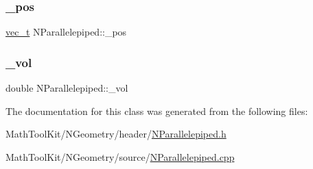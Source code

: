 \mbox{\label{class_n_parallelepiped_ae1cc22beb853095d8a110c641dd8e005}} 
\subsubsection{\texorpdfstring{\_pos}{\_pos}}
{\footnotesize\ttfamily \mbox{\hyperlink{_n_vector_8h_a0a2cfc67e738a3d73e4f12098c4c07f6}{vec\+\_\+t}} N\+Parallelepiped\+::\+\_\+pos\hspace{0.3cm}{\ttfamily [protected]}}

\mbox{\label{class_n_parallelepiped_aabd33c4ffeff864ea342440c08d4702b}} 
\subsubsection{\texorpdfstring{\_vol}{\_vol}}
{\footnotesize\ttfamily double N\+Parallelepiped\+::\+\_\+vol\hspace{0.3cm}{\ttfamily [protected]}}



The documentation for this class was generated from the following files\+:\begin{DoxyCompactItemize}
\item 
Math\+Tool\+Kit/\+N\+Geometry/header/\mbox{\hyperlink{_n_parallelepiped_8h}{N\+Parallelepiped.\+h}}\item 
Math\+Tool\+Kit/\+N\+Geometry/source/\mbox{\hyperlink{_n_parallelepiped_8cpp}{N\+Parallelepiped.\+cpp}}\end{DoxyCompactItemize}

